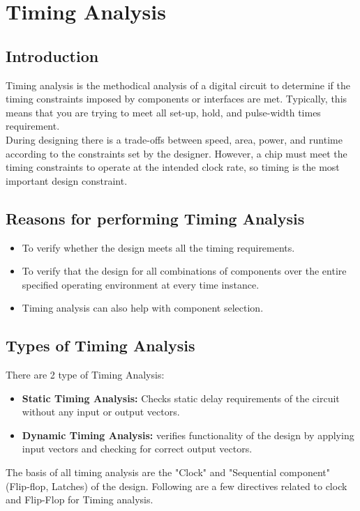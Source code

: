 \section{Timing Analysis}

\subsection{Introduction}
Timing analysis is the methodical analysis of a digital circuit to determine if the timing constraints imposed by components or interfaces are met. Typically, this means that you are trying to meet all set-up, hold, and pulse-width times requirement.\\ During designing there is a trade-offs between speed, area, power, and runtime according to the constraints set by the designer. However, a chip must meet the timing constraints to operate at the intended clock rate, so timing is the most important design constraint.

\subsection{Reasons for performing Timing Analysis}
\begin{itemize}
    \item To verify whether the design meets all the timing requirements.
    \item To verify that the design for all combinations of components over the entire specified operating environment at every time instance. 
    \item Timing analysis can also help with component selection.
\end{itemize}

\subsection{Types of Timing Analysis}

There are 2 type of Timing Analysis:
\begin{itemize}
    \item \textbf{Static Timing Analysis:} Checks static delay requirements of the circuit without any input or output vectors.
    \item \textbf{Dynamic Timing Analysis:} verifies functionality of the design by applying input vectors and checking for correct output vectors.
\end{itemize}

The basis of all timing analysis are the "Clock" and "Sequential component" (Flip-flop, Latches) of the design. Following are a few directives related to clock and Flip-Flop for Timing analysis.
